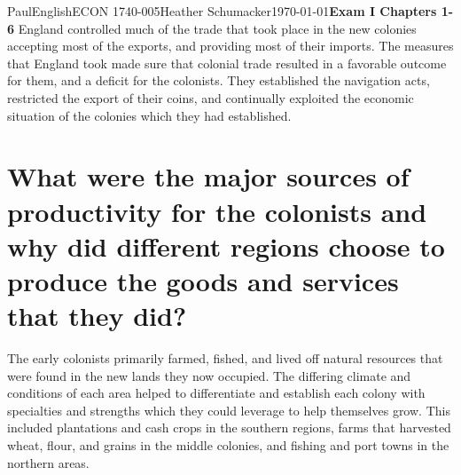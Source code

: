 \documentclass[12pt,letterpaper]{article}
\begin{document}
\begin{mla}{Paul}{English}{ECON 1740-005}{Heather
    Schumacker}{\today}{\textbf{Exam I Chapters 1-6}}
England controlled much of the trade that took place in the new
colonies accepting most of the exports, and providing most of their
imports. The measures that England took made sure that colonial trade
resulted in a favorable outcome for them, and a deficit for the
colonists. They established the navigation acts, restricted the export
of their coins, and continually exploited the economic situation of
the colonies which they had established. 







\pagebreak

\singlespacing
\section{What were the major sources of productivity for the colonists
and why did different regions choose to produce the goods and services
that they did?}
\doublespacing





The early colonists primarily farmed, fished, and lived off natural
resources that were found in the new lands they now occupied. The
differing climate and conditions of each area helped to differentiate
and establish each colony with specialties and strengths which they
could leverage to help themselves grow. This included plantations and
cash crops in the southern regions, farms that harvested wheat, flour,
and grains in the middle colonies, and fishing and port towns in the
northern areas. 


\end{mla}
\end{document}
